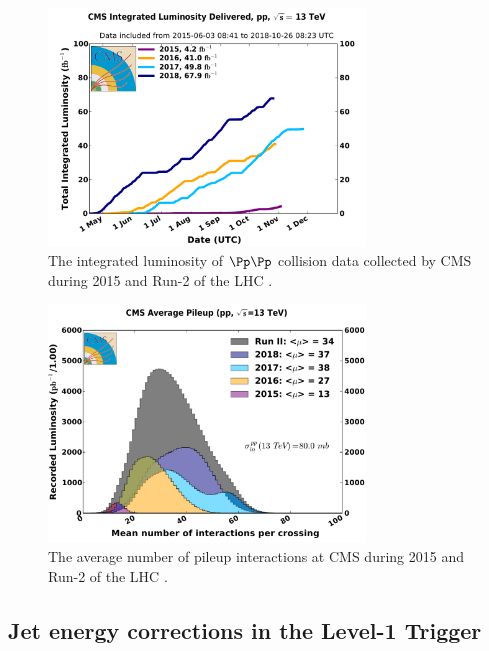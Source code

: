 \begin{figure}[htbp]
    \centering
    \includegraphics[width=0.75\textwidth]{figures/int_lumi_cumulative_pp_2_run2.pdf}
    \caption[The integrated luminosity of $\Pp\Pp$ collision data collected by CMS during 2015 and Run-2 of the LHC]{The integrated luminosity of $\Pp\Pp$ collision data collected by CMS during 2015 and Run-2 of the LHC \cite{cmslumitwikipage}.}
    \label{fig:detector_cms_lumi}
\end{figure}

\begin{figure}[htbp]
    \centering
    \includegraphics[width=0.75\textwidth]{figures/pileup_allYears_run2.pdf}
    \caption[The average number of pileup interactions at CMS during 2015 and Run-2 of the LHC]{The average number of pileup interactions at CMS during 2015 and Run-2 of the LHC \cite{cmslumitwikipage}.}
    \label{fig:detector_cms_pileup}
\end{figure}


\subsection{Jet energy corrections in the Level-1 Trigger}
\label{subsubsec:detector_jecs}

